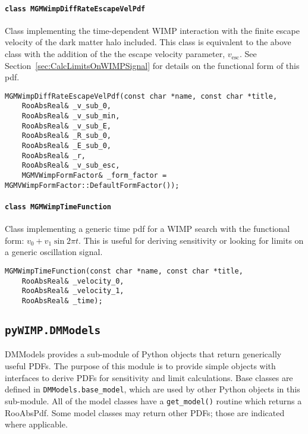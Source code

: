 			\paragraph{\lstinline!class MGMWimpDiffRateEscapeVelPdf!}
Class implementing the time-dependent WIMP interaction with the finite escape velocity of the dark matter halo included.  This class is equivalent to the above class with the addition of the the escape velocity parameter, $v_{\text{esc}}$.  See Section~\ref{sec:CalcLimitsOnWIMPSignal} for details on the functional form of this pdf.
				\begin{lstlisting}
MGMWimpDiffRateEscapeVelPdf(const char *name, const char *title,
	RooAbsReal& _v_sub_0,
	RooAbsReal& _v_sub_min,
	RooAbsReal& _v_sub_E,
	RooAbsReal& _R_sub_0,
	RooAbsReal& _E_sub_0,
	RooAbsReal& _r,
	RooAbsReal& _v_sub_esc,
	MGMVWimpFormFactor& _form_factor = MGMVWimpFormFactor::DefaultFormFactor());
				\end{lstlisting}	

			\paragraph{\lstinline!class MGMWimpTimeFunction!}
Class implementing a generic time pdf for a WIMP search with the functional form: $v_{0} + v_{1}\sin{2\pi t}$.  This is useful for deriving sensitivity or looking for limits on a generic oscillation signal.			
				\begin{lstlisting}
MGMWimpTimeFunction(const char *name, const char *title,
	RooAbsReal& _velocity_0,
	RooAbsReal& _velocity_1,
	RooAbsReal& _time);

				\end{lstlisting}
					
			\lstset{
			   language=Python}							
		\subsection{\lstinline!pyWIMP.DMModels!}
		
	DMModels provides a sub-module of Python objects that return generically
useful PDFs.  The purpose of this module is to provide simple objects with
interfaces to derive PDFs for sensitivity and limit calculations.  Base classes
are defined in \lstinline!DMModels.base_model!, which are used by other Python
objects in this sub-module.  All of the model classes have a \lstinline!get_model()!
routine which returns a RooAbsPdf.  Some model classes may return other PDFs; those 
are indicated where applicable.
	
